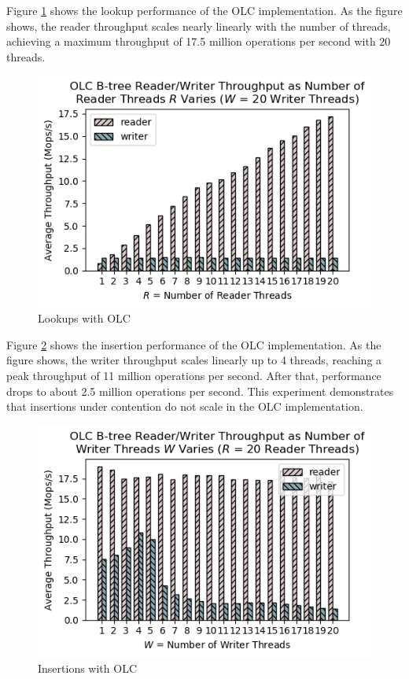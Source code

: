 \documentclass[twocolumn]{article}
\begin{document}
Figure \ref{fig:olclookup} shows the lookup performance of the OLC
implementation. As the figure shows, the reader throughput scales nearly
linearly with the number of threads, achieving a maximum throughput of 17.5
million operations per second with 20 threads.

\begin{figure}[ht]
    \centering \includegraphics[width=\columnwidth]{figures/olc_w20_r1-20_avg.png}
    \caption{Lookups with OLC \label{fig:olclookup}}
\end{figure}

Figure \ref{fig:olcinsert} shows the insertion performance of the OLC
implementation. As the figure shows, the writer throughput scales linearly up
to 4 threads, reaching a peak throughput of 11 million operations per second.
After that, performance drops to about 2.5 million operations per second. This
experiment demonstrates that insertions under contention do not scale in the
OLC implementation.

\begin{figure}[ht]
    \centering \includegraphics[width=\columnwidth]{figures/olc_r20_w1-20_avg.png}
    \caption{Insertions with OLC \label{fig:olcinsert}}
\end{figure}
\end{document}
